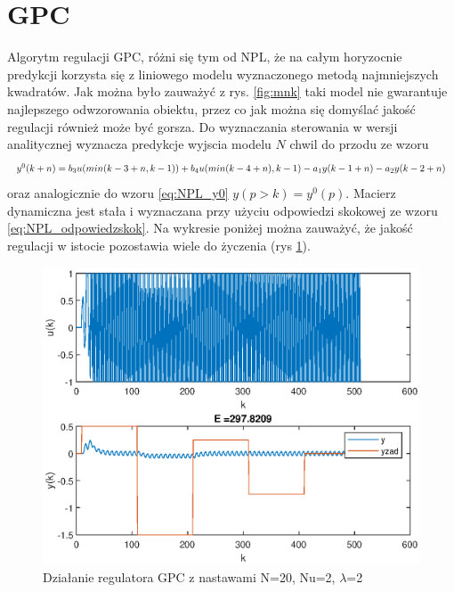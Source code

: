 		
	\section{GPC}
		\label{sec:GPC}
		Algorytm regulacji GPC, różni się tym od NPL, że na całym horyzocnie predykcji korzysta się z liniowego modelu wyznaczonego metodą najmniejszych kwadratów. Jak można było zauważyć z rys. \ref{fig:mnk} taki model nie gwarantuje najlepszego odwzorowania obiektu, przez co jak można się domyślać jakość regulacji również może być gorsza.
		Do wyznaczania sterowania w wersji analitycznej wyznacza predykcje wyjscia modelu $N$ chwil do przodu ze wzoru
		\begin{equation}
		\begin{tabular}{l}
		$y^0(k+n)=b_3u(min(k-3+n,k-1))+b_4u(min(k-4+n),k-1)-a_1y(k-1+n)-a_2y(k-2+n)$
		\end{tabular}
		\label{eq:NPL_odpowiedzskok}
		\end{equation}
		oraz analogicznie do wzoru \ref{eq:NPL_y0} $y(p>k)=y^0(p)$. Macierz dynamiczna jest stała i wyznaczana przy użyciu odpowiedzi skokowej ze wzoru \ref{eq:NPL_odpowiedzskok}. Na wykresie poniżej można zauważyć, że jakość regulacji w istocie pozostawia wiele do życzenia (rys \ref{fig:GPC}).
		
		\begin{figure}[h!]
			\centering
			\includegraphics[width=\linewidth]{img/GPC.eps}
			\caption{Działanie regulatora GPC z nastawami N=20, Nu=2, $\lambda$=2}
			\label{fig:GPC}
		\end{figure}
	
